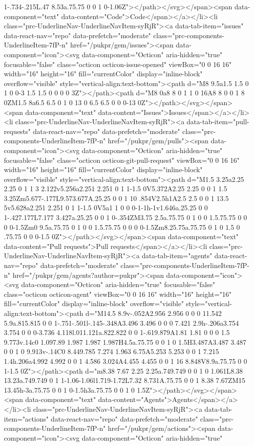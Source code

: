 1-.734-.215L.47 8.53a.75.75 0 0 1 0-1.06Z"></path></svg></span><span data-component="text" data-content="Code">Code</span></a></li><li class="prc-UnderlineNav-UnderlineNavItem-syRjR"><a data-tab-item="issues" data-react-nav="repo" data-prefetch="moderate" class="prc-components-UnderlineItem-7fP-n" href="/pukpr/gem/issues"><span data-component="icon"><svg data-component="Octicon" aria-hidden="true" focusable="false" class="octicon octicon-issue-opened" viewBox="0 0 16 16" width="16" height="16" fill="currentColor" display="inline-block" overflow="visible" style="vertical-align:text-bottom"><path d="M8 9.5a1.5 1.5 0 1 0 0-3 1.5 1.5 0 0 0 0 3Z"></path><path d="M8 0a8 8 0 1 1 0 16A8 8 0 0 1 8 0ZM1.5 8a6.5 6.5 0 1 0 13 0 6.5 6.5 0 0 0-13 0Z"></path></svg></span><span data-component="text" data-content="Issues">Issues</span></a></li><li class="prc-UnderlineNav-UnderlineNavItem-syRjR"><a data-tab-item="pull-requests" data-react-nav="repo" data-prefetch="moderate" class="prc-components-UnderlineItem-7fP-n" href="/pukpr/gem/pulls"><span data-component="icon"><svg data-component="Octicon" aria-hidden="true" focusable="false" class="octicon octicon-git-pull-request" viewBox="0 0 16 16" width="16" height="16" fill="currentColor" display="inline-block" overflow="visible" style="vertical-align:text-bottom"><path d="M1.5 3.25a2.25 2.25 0 1 1 3 2.122v5.256a2.251 2.251 0 1 1-1.5 0V5.372A2.25 2.25 0 0 1 1.5 3.25Zm5.677-.177L9.573.677A.25.25 0 0 1 10 .854V2.5h1A2.5 2.5 0 0 1 13.5 5v5.628a2.251 2.251 0 1 1-1.5 0V5a1 1 0 0 0-1-1h-1v1.646a.25.25 0 0 1-.427.177L7.177 3.427a.25.25 0 0 1 0-.354ZM3.75 2.5a.75.75 0 1 0 0 1.5.75.75 0 0 0 0-1.5Zm0 9.5a.75.75 0 1 0 0 1.5.75.75 0 0 0 0-1.5Zm8.25.75a.75.75 0 1 0 1.5 0 .75.75 0 0 0-1.5 0Z"></path></svg></span><span data-component="text" data-content="Pull requests">Pull requests</span></a></li><li class="prc-UnderlineNav-UnderlineNavItem-syRjR"><a data-tab-item="agents" data-react-nav="repo" data-prefetch="moderate" class="prc-components-UnderlineItem-7fP-n" href="/pukpr/gem/agents?author=pukpr"><span data-component="icon"><svg data-component="Octicon" aria-hidden="true" focusable="false" class="octicon octicon-agent" viewBox="0 0 16 16" width="16" height="16" fill="currentColor" display="inline-block" overflow="visible" style="vertical-align:text-bottom"><path d="M14.5 8.9v-.052A2.956 2.956 0 0 0 11.542 5.9a.815.815 0 0 1-.751-.501l-.145-.348A3.496 3.496 0 0 0 7.421 2.9h-.206a3.754 3.754 0 0 0-3.736 4.118l.011.121a.822.822 0 0 1-.619.879A1.81 1.81 0 0 0 1.5 9.773v.14c0 1.097.89 1.987 1.987 1.987H4.5a.75.75 0 0 1 0 1.5H3.487A3.487 3.487 0 0 1 0 9.913v-.14C0 8.449.785 7.274 1.963 6.75A5.253 5.253 0 0 1 7.215 1.4h.206a4.992 4.992 0 0 1 4.586 3.024A4.455 4.455 0 0 1 16 8.848V8.9a.75.75 0 0 1-1.5 0Z"></path><path d="m8.38 7.67 2.25 2.25a.749.749 0 0 1 0 1.061L8.38 13.23a.749.749 0 1 1-1.06-1.06l1.719-1.72L7.32 8.731A.75.75 0 0 1 8.38 7.67ZM15 13.45h-3a.75.75 0 0 1 0-1.5h3a.75.75 0 0 1 0 1.5Z"></path></svg></span><span data-component="text" data-content="Agents">Agents</span></a></li><li class="prc-UnderlineNav-UnderlineNavItem-syRjR"><a data-tab-item="actions" data-react-nav="repo" data-prefetch="moderate" class="prc-components-UnderlineItem-7fP-n" href="/pukpr/gem/actions"><span data-component="icon"><svg data-component="Octicon" aria-hidden="true" 